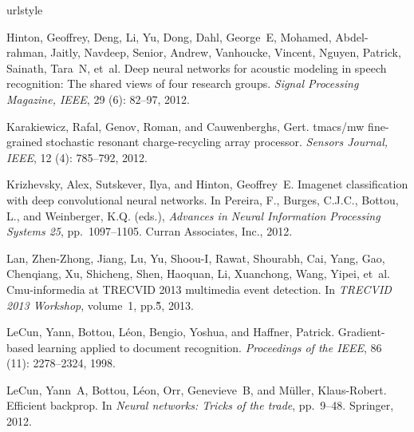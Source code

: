 \documentclass{article} %
\begin{document}

\small
\begin{thebibliography}{10}
\providecommand{\natexlab}[1]{#1}
\providecommand{\url}[1]{\texttt{#1}}
\expandafter\ifx\csname urlstyle\endcsname\relax
  \providecommand{\doi}[1]{doi: #1}\else
  \providecommand{\doi}{doi: \begingroup \urlstyle{rm}\Url}\fi

Hinton, Geoffrey, Deng, Li, Yu, Dong, Dahl, George~E, Mohamed, Abdel-rahman,
  Jaitly, Navdeep, Senior, Andrew, Vanhoucke, Vincent, Nguyen, Patrick,
  Sainath, Tara~N, et~al.
\newblock Deep neural networks for acoustic modeling in speech recognition: The
  shared views of four research groups.
\newblock \emph{Signal Processing Magazine, IEEE}, 29 (6):
  82--97, 2012.

Karakiewicz, Rafal, Genov, Roman, and Cauwenberghs, Gert.
 tmacs/mw fine-grained stochastic resonant charge-recycling array
  processor.
\newblock \emph{Sensors Journal, IEEE}, 12 (4): 785--792,
  2012.

Krizhevsky, Alex, Sutskever, Ilya, and Hinton, Geoffrey~E.
\newblock Imagenet classification with deep convolutional neural networks.
\newblock In Pereira, F., Burges, C.J.C., Bottou, L., and Weinberger, K.Q.
  (eds.), \emph{Advances in Neural Information Processing Systems 25}, pp.\  1097--1105. Curran Associates, Inc., 2012.

Lan, Zhen-Zhong, Jiang, Lu, Yu, Shoou-I, Rawat, Shourabh, Cai, Yang, Gao,
  Chenqiang, Xu, Shicheng, Shen, Haoquan, Li, Xuanchong, Wang, Yipei, et~al.
\newblock Cmu-informedia at {TRECVID} 2013 multimedia event detection.
\newblock In \emph{TRECVID 2013 Workshop}, volume~1, pp.\~5, 2013.

LeCun, Yann, Bottou, L{\'e}on, Bengio, Yoshua, and Haffner, Patrick.
\newblock Gradient-based learning applied to document recognition.
\newblock \emph{Proceedings of the IEEE}, 86 (11):
  2278--2324, 1998.

LeCun, Yann~A, Bottou, L{\'e}on, Orr, Genevieve~B, and M{\"u}ller,
  Klaus-Robert.
\newblock Efficient backprop.
\newblock In \emph{Neural networks: Tricks of the trade}, pp.\ 9--48.
  Springer, 2012.


\end{thebibliography}
\end{document}
